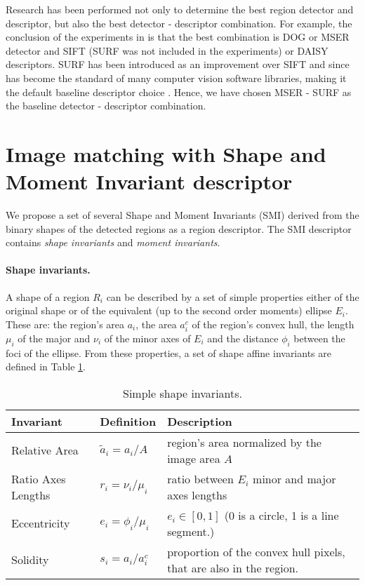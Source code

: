 \documentclass[a4paper,11pt]{article}
\begin{document}
Research has been performed not only to determine the best region detector and descriptor, but also the best detector - descriptor combination.
For example, the conclusion of the experiments in \cite{DahlAP11} is that the best combination is DOG or MSER detector and SIFT (SURF was not included in the experiments) or DAISY descriptors. SURF has been introduced as an improvement over SIFT and since has become the standard of many computer vision software libraries, making it the default baseline descriptor choice \cite{Bay2008}.
Hence, we have chosen MSER - SURF as the baseline detector - descriptor combination.

\section{Image matching with Shape and Moment Invariant descriptor}\label{sec:match}
We propose a set of several Shape and Moment Invariants (SMI) derived from the binary shapes of the detected regions as a region descriptor. The SMI descriptor contains {\em shape invariants} and {\em moment invariants}.

\paragraph{Shape invariants.}
A shape of a region $R_i$ can be described by a set of simple properties either of the original shape or of the equivalent (up to the second order moments) ellipse $E_i$. These are: the region's area $a_i$, the area  $a^c_i$ of the region's convex hull, the length  $\mu_i$ of the major and  $\nu_i$ of the minor axes of $E_i$ and the distance  $\phi_i$ between the foci of the ellipse. From these properties, a set of shape affine invariants are defined in Table \ref{tab:ssi}.   

\begin{table}[!ht]
\begin{center}
\begin{tabular}{|l||l|l|}
\hline
Invariant & Definition & Description\\
\hline
\hline
Relative Area & $\tilde{a}_i = {a_i}/{A}$ & region's area normalized by the image area $A$\\
\hline
Ratio Axes Lengths & $r_i = {\nu_i}/{\mu_i}$& ratio between $E_i$ minor and major axes lengths\\
\hline
Eccentricity &$e_i = \phi_i/\mu_i$& $e_i \in [0,1]$ (0 is a circle, 1 is a line segment.)\\
\hline
Solidity & $s_i = {a_i}/{a_i^c} $ & proportion of the convex hull pixels, that are also in the region. \\
\hline
\end{tabular}
\end{center}
\vspace{-20pt}
\caption{\small Simple shape invariants.} \label{tab:ssi}
  \vspace{-20pt}
\end{table}
\end{document}
